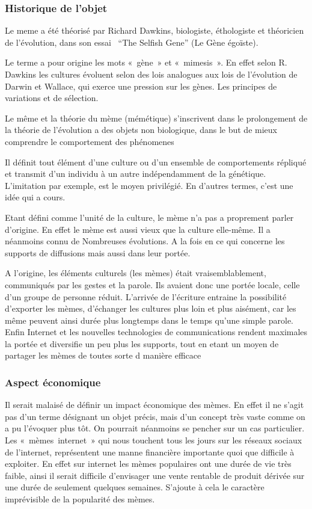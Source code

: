 \documentclass[12pt]{article}
\begin{document}
\subsubsection{Historique de l'objet}

Le meme a été théorisé par Richard Dawkins, biologiste, éthologiste et
théoricien de l'évolution, dans son essai ~``The Selfish Gene'' (Le Gène
égoïste). \cite{gene}

Le terme a pour origine les mots «~gène~» et «~mimesis~». En effet selon
R. Dawkins les cultures évoluent selon des lois analogues aux lois de
l'évolution de Darwin et Wallace, qui exerce une pression sur les gènes.
Les principes de variations et de sélection. \cite{larousse}

Le même et la théorie du mème (mémétique) s'inscrivent dans le
prolongement de la théorie de l'évolution a des objets non biologique,
dans le but de mieux comprendre le comportement des phénomenes

Il définit tout élément d'une culture ou d'un ensemble de comportements
répliqué et transmit d'un individu à un autre indépendamment de la
génétique. L'imitation par exemple, est le moyen privilégié. En d'autres
termes, c'est une idée qui a cours.

Etant défini comme l'unité de la culture, le mème n'a pas a proprement
parler d'origine. En effet le mème est aussi vieux que la culture
elle-même. Il a néanmoins connu de Nombreuses évolutions. A la fois en
ce qui concerne les supports de diffusions mais aussi dans leur portée.

A l'origine, les éléments culturels (les mèmes) était vraisemblablement,
communiqués par les gestes et la parole. Ils avaient donc une portée
locale, celle d'un groupe de personne réduit. L'arrivée de l'écriture
entraine la possibilité d'exporter les mèmes, d'échanger les cultures
plus loin et plus aisément, car les même peuvent ainsi durée plus
longtemps dans le temps qu'une simple parole. Enfin Internet et les
nouvelles technologies de communications rendent maximales la portée et
diversifie un peu plus les supports, tout en etant un moyen de partager
les mèmes de toutes sorte d manière efficace


\subsubsection{Aspect économique}

Il serait malaisé de définir un impact économique des mèmes. En effet il
ne s'agit pas d'un terme désignant un objet précis, mais d'un concept
très vaste comme on a pu l'évoquer plus tôt. On pourrait néanmoins se
pencher sur un cas particulier. Les «~mèmes~internet~» qui nous touchent
tous les jours sur les réseaux sociaux de l'internet, représentent une
manne financière importante quoi que difficile à exploiter.\cite{lorenz} En effet sur
internet les mèmes populaires ont une durée de vie très faible, ainsi il
serait difficile d'envisager une vente rentable de produit dérivée sur
une durée de seulement quelques semaines. S'ajoute à cela le caractère
imprévisible de la popularité des mèmes.\cite{reuter}
\end{document}
